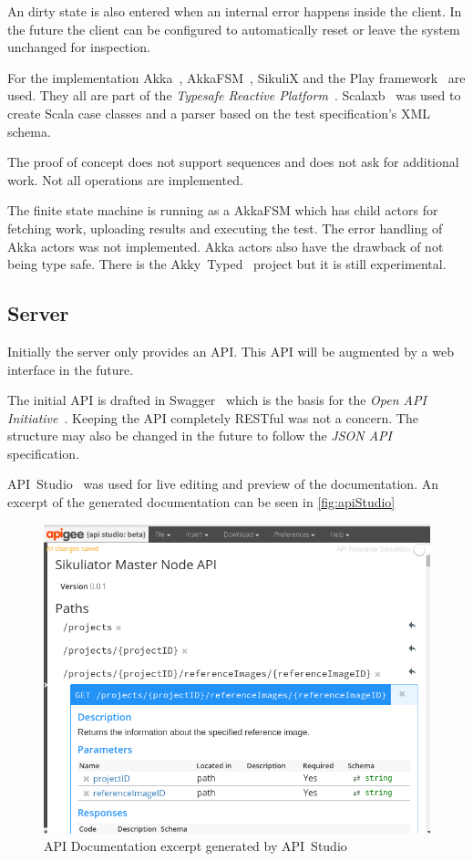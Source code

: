 \documentclass[a4paper,twocolumn,twoside]{article}
\begin{document}
An dirty state is also entered when an internal error happens inside the client.
In the future the client can be configured to automatically reset or leave the system unchanged for inspection.

For the implementation Akka~\cite{Akka}, AkkaFSM~\cite{AkkaFSM}, SikuliX and the Play framework~\cite{Play} are used.
They all are part of the \emph{Typesafe Reactive Platform}~\cite{TypesafeRP}.
Scalaxb~\cite{scalaxb} was used to create Scala case classes and a parser based on the test specification's XML schema.

The proof of concept does not support sequences and does not ask for additional work.
Not all operations are implemented.

The finite state machine is running as a AkkaFSM which has child actors for fetching work, uploading results and executing the test.
The error handling of Akka actors was not implemented.
Akka actors also have the drawback of not being type safe.
There is the Akky~Typed~\cite{AkkaTyped} project but it is still experimental.

\subsection{Server}

Initially the server only provides an API.
This API will be augmented by a web interface in the future.

The initial API is drafted in Swagger~\cite{Swagger} which is the basis for the \emph{Open API Initiative}~\cite{OpenAPI}.
Keeping the API completely RESTful was not a concern.
The structure may also be changed in the future to follow the \emph{JSON API}~\cite{JSONAPI} specification.

API~Studio~\cite{ApiStudio} was used for live editing and preview of the documentation.
An excerpt of the generated documentation can be seen in \autoref{fig:apiStudio}

\begin{figure}[htbp]
	\centering
	\includegraphics[width=1.0\linewidth]{../img/apiStudio}
	\caption{API Documentation excerpt generated by API~Studio}
	\label{fig:apiStudio}
\end{figure}
\end{document}
